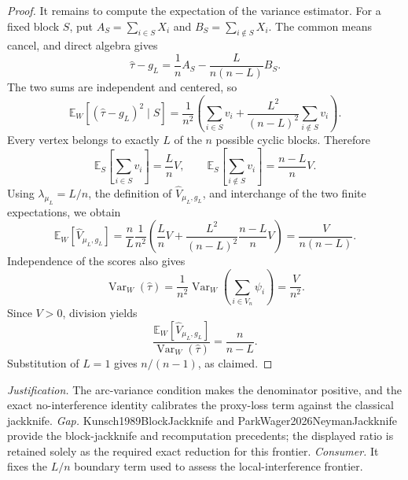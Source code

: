 \documentclass{article}
\begin{document}
\begin{proof}
It remains to compute the expectation of the variance estimator. For a fixed block \(S\), put \(A_S=\sum_{i\in S}X_i\) and \(B_S=\sum_{i\notin S}X_i\). The common means cancel, and direct algebra gives
\[
\widehat\tau-g_L=\frac1n A_S-\frac{L}{n(n-L)}B_S.
\]
The two sums are independent and centered, so
\[
\mathbb E_W[(\widehat\tau-g_L)^2\mid S]=\frac1{n^2}\left(\sum_{i\in S}v_i+\frac{L^2}{(n-L)^2}\sum_{i\notin S}v_i\right).
\]
Every vertex belongs to exactly \(L\) of the \(n\) possible cyclic blocks. Therefore
\[
\mathbb E_S\!\left[\sum_{i\in S}v_i\right]=\frac LnV,\qquad \mathbb E_S\!\left[\sum_{i\notin S}v_i\right]=\frac{n-L}{n}V.
\]
Using \(\lambda_{\mu_L}=L/n\), the definition of \(\widehat V_{\mu_L,g_L}\), and interchange of the two finite expectations, we obtain
\[
\mathbb E_W[\widehat V_{\mu_L,g_L}]=\frac nL\frac1{n^2}\left(\frac LnV+\frac{L^2}{(n-L)^2}\frac{n-L}{n}V\right)=\frac{V}{n(n-L)}.
\]
Independence of the scores also gives
\[
\operatorname{Var}_W(\widehat\tau)=\frac1{n^2}\operatorname{Var}_W\!\left(\sum_{i\in V_n}\psi_i\right)=\frac{V}{n^2}.
\]
Since \(V>0\), division yields
\[
\frac{\mathbb E_W[\widehat V_{\mu_L,g_L}]}{\operatorname{Var}_W(\widehat\tau)}=\frac{n}{n-L}.
\]
Substitution of \(L=1\) gives \(n/(n-1)\), as claimed.
\end{proof}
\par\smallskip\noindent \textit{Justification.} The arc-variance condition makes the denominator positive, and the exact no-interference identity calibrates the proxy-loss term against the classical jackknife. \textit{Gap.} Kunsch1989BlockJackknife and ParkWager2026NeymanJackknife provide the block-jackknife and recomputation precedents; the displayed ratio is retained solely as the required exact reduction for this frontier. \textit{Consumer.} It fixes the \(L/n\) boundary term used to assess the local-interference frontier.
\end{document}
